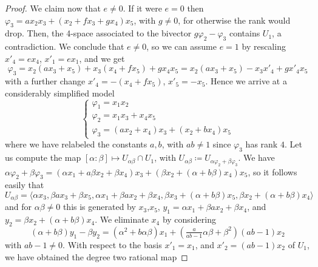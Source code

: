 \documentclass[10pt,reqno]{amsart}
\newcommand{\la}{\langle}
\newcommand{\ra}{\rangle}
\renewcommand{\a}{\alpha}
\renewcommand{\b}{\beta}
\newcommand{\f}{\varphi}
\theoremstyle{definition}
\begin{document}
\begin{proof}
\item We claim now that $e\ne 0$. If it were $e=0$ then $\f_3=ax_2x_3+(x_2+fx_3+gx_4)x_5$, with $g \ne 0$, for otherwise the rank would drop. Then, the 4-space associated to the bivector $g\f_2-\f_3$ contains $U_1$, a contradiction.
We conclude that $e \ne 0$, so we can assume $e=1$ by rescaling $x'_4=ex_4$, $x'_1=ex_1$, and we get 
\[
\f_3=x_2(ax_3+x_5)+x_3(x_4+fx_5)+gx_4x_5=x_2(ax_3+x_5)-x_3x'_4+gx'_4x_5
\]
with a further change $x'_4=-(x_4+fx_5)$, $x'_5=-x_5$. Hence we arrive at a considerably simplified model
\begin{equation} \label{eq:model16-preliminary}
 \begin{cases}
    \f_1=x_1x_2 \\
    \f_2=x_1x_3+x_4x_5 \\
    \f_3=(ax_2+x_4)x_3+(x_2+bx_4)x_5
\end{cases}   
\end{equation}
where we have relabeled the constants $a,b$, with $ab \ne 1$ since $\f_3$ has rank $4$. Let us compute the map $[\a:\b] \mapsto U_{\a \b } \cap U_1$, with $U_{\a \b}\coloneqq U_{\a \f_2+ \b \f_3}$. We have $\a \f_2+\b \f_3=(\a x_1+a\b x_2+\b x_4)x_3+(\b x_2+(\a+b\b)x_4)x_5$, so it follows easily that
\[
U_{\a \b}=\la\a x_3,\b ax_3+\b x_5,\a x_1+\b a x_2+\b x_4,\b x_3 + (\a + b \b) x_5,\b x_2+(\a+b \b) x_4\ra
\]
and for $\a\b\ne 0$ this is generated by $x_3$,$x_5$, $y_1=\a x_1+\b ax_2+\b x_4$, and $y_2=\b x_2+(\a+b \b)x_4$. We eliminate $x_4$ by considering 
\[
(\a +b \b)y_1-\b y_2=(\a^2+b \a \b)x_1+(\tfrac{a}{ab-1} \a \b +\b^2) (ab-1)x_2
\]
with $ab-1 \ne 0$. With respect to the basis $x'_1=x_1$, and $x'_2=(ab-1)x_2$ of $U_1$, we have obtained the degree two rational map 

\end{proof}
\end{document}
